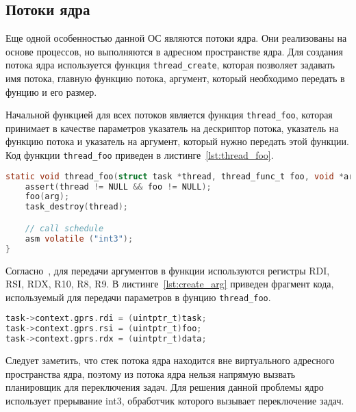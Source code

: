 \subsection{Потоки ядра}
Еще одной особенностью данной ОС являются потоки ядра. Они реализованы на основе процессов, но
выполняются в адресном пространстве ядра. Для создания потока ядра используется функция \texttt{thread\_create},
которая позволяет задавать имя потока, главную функцию потока, аргумент, который необходимо передать в фунцию
и его размер.

Начальной функцией для всех потоков является функция \texttt{thread\_foo}, которая принимает в качестве
параметров указатель на дескриптор потока, указатель на функцию потока и указатель на аргумент, который
нужно передать этой функции. Код функции \texttt{thread\_foo} приведен в листинге~\ref{lst:thread_foo}.

\begin{lstlisting}[language=C,
caption={Точка входа потоков ядра},
label={lst:thread_foo}]
static void thread_foo(struct task *thread, thread_func_t foo, void *arg) {
	assert(thread != NULL && foo != NULL);
	foo(arg);
	task_destroy(thread);

	// call schedule
	asm volatile ("int3");
}
\end{lstlisting}

Согласно~\cite{x86_64_abi}, для передачи аргументов в функции используются регистры RDI, RSI, RDX, R10, R8, R9.
В листинге~\ref{lst:create_arg} приведен фрагмент кода, используемый для передачи параметров в фунцию \texttt{thread\_foo}.

\begin{lstlisting}[language=C,
caption={Передача параметров в функцию \texttt{thread\_foo}},
label={lst:create_args}]
task->context.gprs.rdi = (uintptr_t)task;
task->context.gprs.rsi = (uintptr_t)foo;
task->context.gprs.rdx = (uintptr_t)data;
\end{lstlisting}

Следует заметить, что стек потока ядра находится вне виртуального адресного пространства ядра,
поэтому из потока ядра нельзя напрямую вызвать планировщик для переключения задач. Для решения данной
проблемы ядро использует прерывание int3, обработчик которого вызывает переключение задач.

